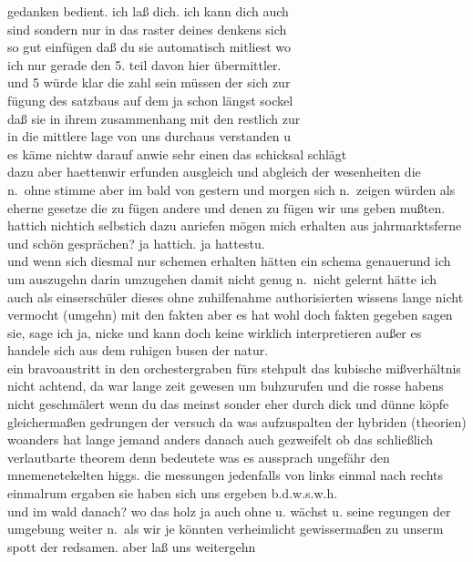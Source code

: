 \documentclass[
]{article}
\begin{document}
\begin{enumerate}
  gedanken bedient. ich laß dich. ich kann dich auch\\
  sind sondern nur in das raster deines denkens sich\\
  so gut einfügen daß du sie automatisch mitliest wo\\
  ich nur gerade den 5. teil davon hier übermittler.\\
  und 5 würde klar die zahl sein müssen der sich zur\\
  fügung des satzbaus auf dem ja schon längst sockel\\
  daß sie in ihrem zusammenhang mit den restlich zur\\
  in die mittlere lage von uns durchaus verstanden u\\
  es käme nichtw darauf anwie sehr einen das schicksal schlägt\\
  dazu aber haettenwir erfunden ausgleich und abgleich der wesenheiten
  die n.~ohne stimme aber im bald von gestern und morgen sich n.~zeigen
  würden als eherne gesetze die zu fügen andere und denen zu fügen wir
  uns geben mußten. hattich nichtich selbstich dazu anriefen mögen mich
  erhalten aus jahrmarktsferne und schön gesprächen? ja hattich. ja
  hattestu.\\
  und wenn sich diesmal nur schemen erhalten hätten ein schema
  genauerund ich um auszugehn darin umzugehen damit nicht genug n.~nicht
  gelernt hätte ich auch als einserschüler dieses ohne zuhilfenahme
  authorisierten wissens lange nicht vermocht (umgehn) mit den fakten
  aber es hat wohl doch fakten gegeben sagen sie, sage ich ja, nicke und
  kann doch keine wirklich interpretieren außer es handele sich aus dem
  ruhigen busen der natur.\\
  ein bravoaustritt in den orchestergraben fürs stehpult das kubische
  mißverhältnis nicht achtend, da war lange zeit gewesen um buhzurufen
  und die rosse habens nicht geschmälert wenn du das meinst sonder eher
  durch dick und dünne köpfe gleichermaßen gedrungen der versuch da was
  aufzuspalten der hybriden (theorien) woanders hat lange jemand anders
  danach auch gezweifelt ob das schließlich verlautbarte theorem denn
  bedeutete was es aussprach ungefähr den mnemenetekelten higgs. die
  messungen jedenfalls von links einmal nach rechts einmalrum ergaben
  sie haben sich uns ergeben b.d.w.s.w.h.\\
  und im wald danach? wo das holz ja auch ohne u. wächst u. seine
  regungen der umgebung weiter n.~als wir je könnten verheimlicht
  gewissermaßen zu unserm spott der redsamen. aber laß uns weitergehn

\end{enumerate}
\end{document}

